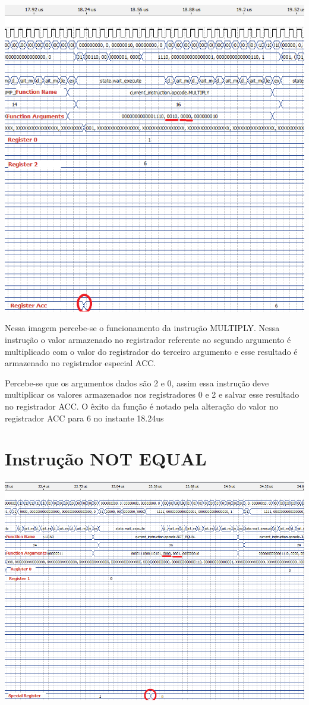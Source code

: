 \documentclass[11pt]{report}
\begin{document}
\includegraphics[width=\textwidth]{multiply}

Nessa imagem percebe-se o funcionamento da instrução MULTIPLY. Nessa instrução o valor armazenado no registrador referente ao segundo argumento é multiplicado com o valor do registrador do terceiro argumento e esse resultado é armazenado no registrador especial ACC.

Percebe-se que os argumentos dados são 2 e 0, assim essa instrução deve multiplicar os valores armazenados nos registradores 0 e 2 e salvar esse resultado no registrador ACC. O êxito da função é notado pela alteração do valor no registrador ACC para 6 no instante 18.24us

\section{Instrução NOT EQUAL}

\includegraphics[width=\textwidth]{not_equal}
\end{document}
